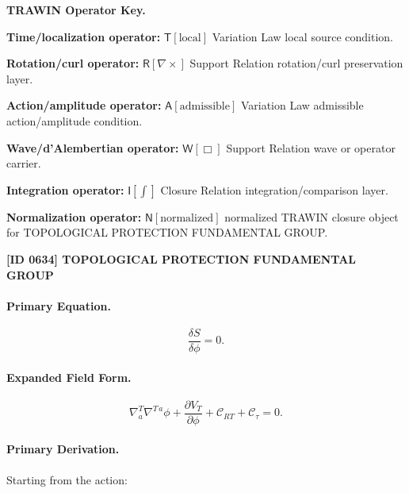 \par\vspace{0.45\baselineskip}
\noindent\begin{minipage}[t]{\linewidth}
\begingroup
\small
\raggedright
\textbf{TRAWIN Operator Key.}\par
\noindent\textbf{Time/localization operator:} $\mathsf{T}\!\left[\mathrm{local}\right]$ Variation Law local source condition.\par
\noindent\textbf{Rotation/curl operator:} $\mathsf{R}\!\left[\nabla\times\right]$ Support Relation rotation/curl preservation layer.\par
\noindent\textbf{Action/amplitude operator:} $\mathsf{A}\!\left[\mathrm{admissible}\right]$ Variation Law admissible action/amplitude condition.\par
\noindent\textbf{Wave/d'Alembertian operator:} $\mathsf{W}\!\left[\Box\right]$ Support Relation wave or operator carrier.\par
\noindent\textbf{Integration operator:} $\mathsf{I}\!\left[\int\right]$ Closure Relation integration/comparison layer.\par
\noindent\textbf{Normalization operator:} $\mathsf{N}\!\left[\mathrm{normalized}\right]$ normalized TRAWIN closure object for TOPOLOGICAL PROTECTION FUNDAMENTAL GROUP.\par
\endgroup
\end{minipage}

\clearpage
\noindent\textbf{[ID 0634] TOPOLOGICAL PROTECTION FUNDAMENTAL GROUP}\par
\vspace{0.35em}
\paragraph{Primary Equation.}
\begin{equation}
\frac{\delta S}{\delta \phi}=0 .
\end{equation}

\paragraph{Expanded Field Form.}
\begin{equation}
\nabla^T_a\nabla^{T\,a}\phi
+
\frac{\partial V_T}{\partial \phi}
+
\mathcal{C}_{RT}
+
\mathcal{C}_{\tau}
=
0 .
\end{equation}

\paragraph{Primary Derivation.}
Starting from the action:

